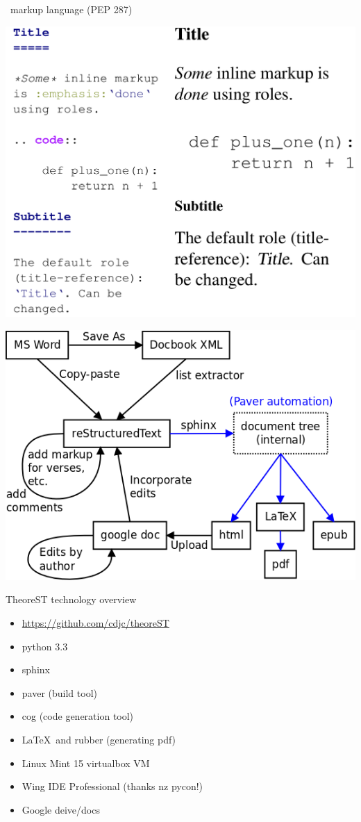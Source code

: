\documentclass{beamer}
\begin{document}
\begin{frame}{\rst\ markup language (PEP 287)}
\centerline{\includegraphics[keepaspectratio=true, width=\paperwidth, height=0.9\paperheight]{rst_example.png}}
\end{frame}

\begin{frame}
    \centerline{\includegraphics[keepaspectratio=true, width=\paperwidth]{theorest_process.png}}
\end{frame}


\begin{frame}[fragile]{TheoreST technology overview}
\begin{itemize}
\item \url{https://github.com/cdjc/theoreST}
\item python 3.3
\item sphinx
\item paver (build tool)
\item cog (code generation tool)
\item \LaTeX\  and rubber (generating pdf)
\item Linux Mint 15 virtualbox VM
\item Wing IDE Professional (thanks nz pycon!)
\item Google deive/docs
\end{itemize}
\end{frame}
\end{document}
